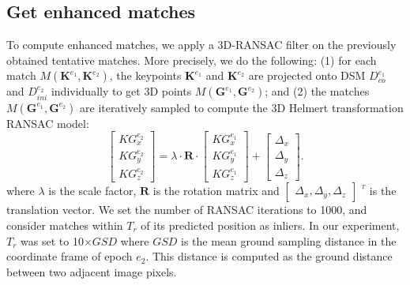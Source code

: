 \subsection{Get enhanced matches}
To compute enhanced matches, we apply a 3D-RANSAC filter on the previously obtained tentative matches. {More precisely, we do the following}: (1) for each match $M({\mathbf{K}^{e_1},\mathbf{K}^{e_2}})$, the keypoints $\mathbf{K}^{e_1}$ and $\mathbf{K}^{e_2}$ are projected onto DSM $D_{co}^{e_1}$ and $D_{ini}^{e_2}$ individually to get 3D points $M({\mathbf{G}^{e_1},\mathbf{G}^{e_2}})$; and (2) {the matches} $M({\mathbf{G}^{e_1},\mathbf{G}^{e_2}})$ are iteratively sampled to compute the 3D Helmert transformation RANSAC model:
\begin{equation}
\left [ \begin{array}{c}
{KG}_x^{e_2}\\
{KG}_y^{e_2}\\
{KG}_z^{e_2}
\end{array}
\right ] =\lambda \cdot \mathbf{R} \cdot {\left [ \begin{array}{c}
	{KG}_x^{e_1}\\
	{KG}_y^{e_1}\\
	{KG}_z^{e_1}
	\end{array}
	\right ]} + \left [ \begin{array}{c}
\Delta_x\\
\Delta_y\\
\Delta_z
\end{array}
\right ]. \label{eq:2DSim}
\end{equation}
where $\lambda$ is the scale factor, $\mathbf{R}$ is the rotation matrix and $\left [ \begin{array}{c}
\Delta_x, \Delta_y, \Delta_z
\end{array}
\right ]$ $^{^T}$ is the translation vector.
We set the number of RANSAC iterations to 1000, and consider matches within $T_r$ of its predicted position as inliers. In our experiment, {$T_r$ was set to 10$\times$$GSD$ where $GSD$ is the mean ground sampling distance in the coordinate frame of epoch ${e_2}$. This distance is computed as the ground distance between two adjacent image pixels.}

